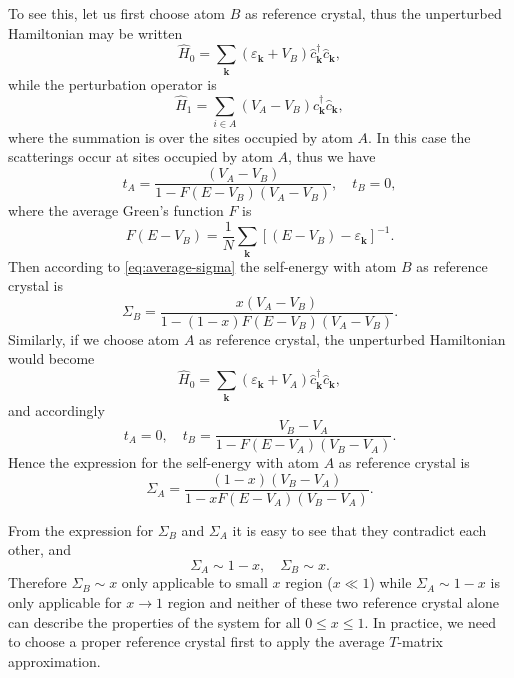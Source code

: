 \documentclass{book}
\numberwithin{equation}{section}
\begin{document}
To see this, let us first choose atom $B$ as reference crystal, thus
the unperturbed Hamiltonian may be written
\begin{equation}
  \hat{H}_0=\sum_{\bm{k}}(\varepsilon_{\bm{k}}+V_B)\hat{c}_{\bm{k}}^\dagger\hat{c}_{\bm{k}},
\end{equation}
while the perturbation operator is
\begin{equation}
  \hat{H}_1=\sum_{i\in A}(V_A-V_B)\hat{c}_{\bm{k}}^\dagger\hat{c}_{\bm{k}},
\end{equation}
where the summation is over the sites occupied by atom $A$. In this
case the scatterings occur at sites occupied by atom $A$, thus we have
\begin{equation}
  t_A=\frac{(V_A-V_B)}{1-F(E-V_B)(V_A-V_B)},\quad t_B=0,
\end{equation}
where the average Green's function $F$ is
\begin{equation}
  F(E-V_B)=\frac{1}{N}\sum_{\bm{k}}[(E-V_B)-\varepsilon_{\bm{k}}]^{-1}.
\end{equation}
Then according to \eqref{eq:average-sigma} the self-energy with atom
$B$ as reference crystal is
\begin{equation}
  \Sigma_B=\frac{x(V_A-V_B)}{1-(1-x)F(E-V_B)(V_A-V_B)}.
\end{equation}
Similarly, if we choose atom $A$ as reference crystal, the unperturbed
Hamiltonian would become
\begin{equation}
  \hat{H}_0=\sum_{\bm{k}}(\varepsilon_{\bm{k}}+V_A)\hat{c}_{\bm{k}}^\dagger\hat{c}_{\bm{k}},
\end{equation}
and accordingly
\begin{equation}
  t_A=0,\quad t_B=\frac{V_B-V_A}{1-F(E-V_A)(V_B-V_A)}.
\end{equation}
Hence the expression for the self-energy with atom $A$ as reference
crystal is
\begin{equation}
  \Sigma_A=\frac{(1-x)(V_B-V_A)}{1-xF(E-V_A)(V_B-V_A)}.
\end{equation}

From the expression for $\Sigma_B$ and $\Sigma_A$ it is easy to see
that they contradict each other, and
\begin{equation}
  \Sigma_A\sim 1-x,\quad \Sigma_B\sim x.
\end{equation}
Therefore $\Sigma_B\sim x$ only applicable to small $x$ region
($x\ll1$) while $\Sigma_A\sim 1-x$ is only applicable for $x\to1$
region and neither of these two reference crystal alone can describe
the properties of the system for all $0\le x\le1$. In practice, we
need to choose a proper reference crystal first to apply the average
$T$-matrix approximation.
\end{document}
